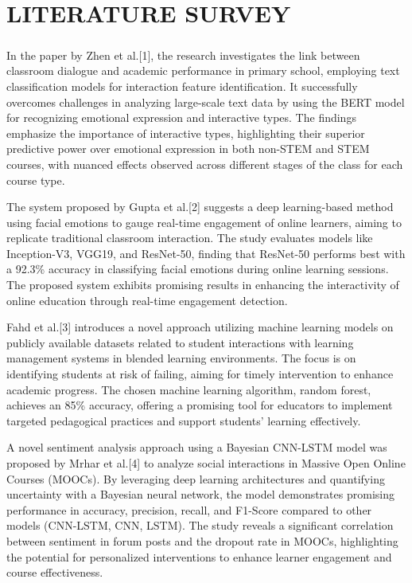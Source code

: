 \chapter[LITERATURE SURVEY]{\fontsize{16}{12}\vspace{-.59in}\selectfont LITERATURE SURVEY}


\paragraph{}
In the paper by  Zhen et al.[1], the research investigates the link between classroom dialogue and academic performance in primary school, employing text classification models for interaction feature identification. It successfully overcomes challenges in analyzing large-scale text data by using the BERT model for recognizing emotional expression and interactive types. The findings emphasize the importance of interactive types, highlighting their superior predictive power over emotional expression in both non-STEM and STEM courses, with nuanced effects observed across different stages of the class for each course type.
\par The system proposed by Gupta et al.[2] suggests a deep learning-based method using facial emotions to gauge real-time engagement of online learners, aiming to replicate traditional classroom interaction. The study evaluates models like Inception-V3, VGG19, and ResNet-50, finding that ResNet-50 performs best with a 92.3\% accuracy in classifying facial emotions during online learning sessions. The proposed system exhibits promising results in enhancing the interactivity of online education through real-time engagement detection.
\par Fahd et al.[3] introduces a novel approach utilizing machine learning models on publicly available datasets related to student interactions with learning management systems in blended learning environments. The focus is on identifying students at risk of failing, aiming for timely intervention to enhance academic progress. The chosen machine learning algorithm, random forest, achieves an 85\% accuracy, offering a promising tool for educators to implement targeted pedagogical practices and support students' learning effectively.
\par A novel sentiment analysis approach using a Bayesian CNN-LSTM model was proposed by Mrhar et al.[4] to analyze social interactions in Massive Open Online Courses (MOOCs). By leveraging deep learning architectures and quantifying uncertainty with a Bayesian neural network, the model demonstrates promising performance in accuracy, precision, recall, and F1-Score compared to other models (CNN-LSTM, CNN, LSTM). The study reveals a significant correlation between sentiment in forum posts and the dropout rate in MOOCs, highlighting the potential for personalized interventions to enhance learner engagement and course effectiveness.
